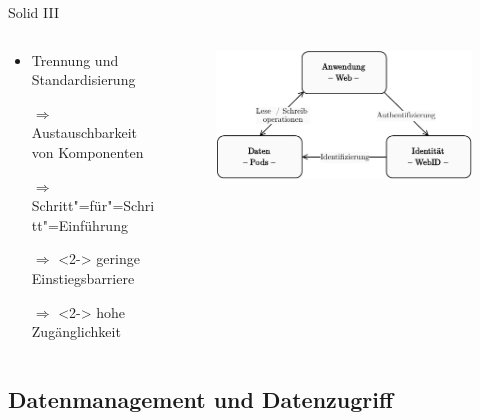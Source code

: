 \begin{frame}{Solid III \footnotesize\cite{mecklerWebLinkedData2023}}
    \begin{columns}
        \begin{column}{0.4\textwidth}
            \begin{itemize}
                \item Trennung und Standardisierung
                \item[$\Rightarrow$] Austauschbarkeit von Komponenten
                \item[$\Rightarrow$] Schritt"=für"=Schritt"=Einführung
                
                \item[$\Rightarrow$]<2-> geringe Einstiegsbarriere
                \item[$\Rightarrow$]<2-> hohe Zugänglichkeit
            \end{itemize}
        \end{column}
        
        \begin{column}{0.6\textwidth}
            \begin{figure}
                \includegraphics[width=\textwidth]{./assets/solid_triangle.drawio.pdf}
            \end{figure}
        \end{column}
    \end{columns}

\end{frame}


\subsection{Datenmanagement und Datenzugriff}

